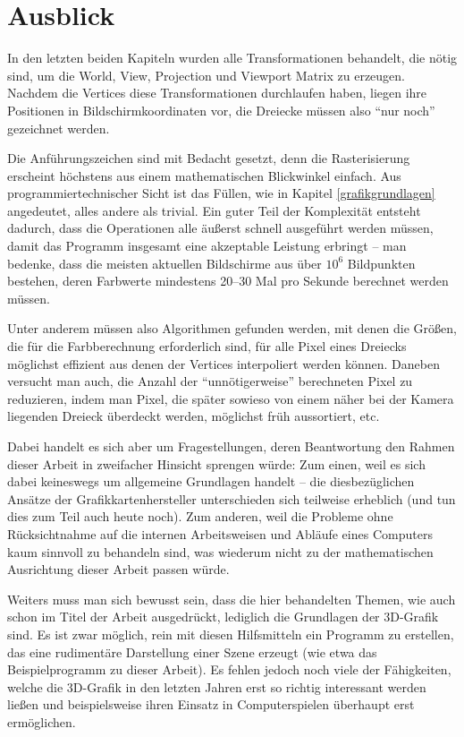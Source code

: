 \chapter{Ausblick}

In den letzten beiden Kapiteln wurden alle Transformationen behandelt, die nötig sind, um die World, View, Projection und Viewport Matrix zu erzeugen. Nachdem die Vertices diese Transformationen durchlaufen haben, liegen ihre Positionen in Bildschirmkoordinaten vor, die Dreiecke müssen also \enquote{nur noch} gezeichnet werden.

Die Anführungszeichen sind mit Bedacht gesetzt, denn die Rasterisierung erscheint höchstens aus einem mathematischen Blickwinkel einfach. Aus programmiertechnischer Sicht ist das Füllen, wie in Kapitel \ref{grafikgrundlagen} angedeutet, alles andere als trivial. Ein guter Teil der Komplexität entsteht dadurch, dass die Operationen alle äußerst schnell ausgeführt werden müssen, damit das Programm insgesamt eine akzeptable Leistung erbringt -- man bedenke, dass die meisten aktuellen Bildschirme aus über $10^6$ Bildpunkten bestehen, deren Farbwerte mindestens 20--30 Mal pro Sekunde berechnet werden müssen.

Unter anderem müssen also Algorithmen gefunden werden, mit denen die Größen, die für die Farbberechnung erforderlich sind, für alle Pixel eines Dreiecks möglichst effizient aus denen der Vertices interpoliert werden können. Daneben versucht man auch, die Anzahl der \enquote{unnötigerweise} berechneten Pixel zu reduzieren, indem man Pixel, die später sowieso von einem näher bei der Kamera liegenden Dreieck überdeckt werden, möglichst früh aussortiert, etc.

Dabei handelt es sich aber um Fragestellungen, deren Beantwortung den Rahmen dieser Arbeit in zweifacher Hinsicht sprengen würde: Zum einen, weil es sich dabei keineswegs um allgemeine Grundlagen handelt -- die diesbezüglichen Ansätze der Grafikkartenhersteller unterschieden sich teilweise erheblich (und tun dies zum Teil auch heute noch). Zum anderen, weil die Probleme ohne Rücksichtnahme auf die internen Arbeitsweisen und Abläufe eines Computers kaum sinnvoll zu behandeln sind, was wiederum nicht zu der mathematischen Ausrichtung dieser Arbeit passen würde.

Weiters muss man sich bewusst sein, dass die hier behandelten Themen, wie auch schon im Titel der Arbeit ausgedrückt, lediglich die Grundlagen der 3D-Grafik sind. Es ist zwar möglich, rein mit diesen Hilfsmitteln ein Programm zu erstellen, das eine rudimentäre Darstellung einer Szene erzeugt (wie etwa das Beispielprogramm zu dieser Arbeit). Es fehlen jedoch noch viele der Fähigkeiten, welche die 3D-Grafik in den letzten Jahren erst so richtig interessant werden ließen und beispielsweise ihren Einsatz in Computerspielen überhaupt erst ermöglichen.


